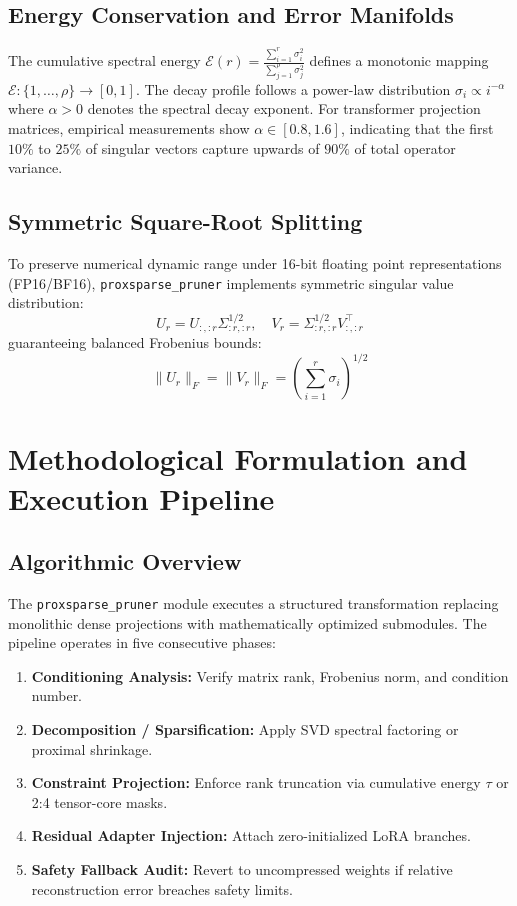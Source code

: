\subsection{Energy Conservation and Error Manifolds}
The cumulative spectral energy $\mathcal{E}(r) = \frac{\sum_{i=1}^r \sigma_i^2}{\sum_{j=1}^\rho \sigma_j^2}$ defines a monotonic mapping $\mathcal{E}: \{1, \dots, \rho\} \to [0, 1]$. The decay profile follows a power-law distribution $\sigma_i \propto i^{-\alpha}$ where $\alpha > 0$ denotes the spectral decay exponent. For transformer projection matrices, empirical measurements show $\alpha \in [0.8, 1.6]$, indicating that the first $10\%$ to $25\%$ of singular vectors capture upwards of $90\%$ of total operator variance.

\subsection{Symmetric Square-Root Splitting}
To preserve numerical dynamic range under 16-bit floating point representations (FP16/BF16), \texttt{proxsparse\_pruner} implements symmetric singular value distribution:
\[
U_r = U_{:, :r} \Sigma_{:r, :r}^{1/2}, \quad V_r = \Sigma_{:r, :r}^{1/2} V_{:, :r}^\top
\]
guaranteeing balanced Frobenius bounds:
\[
\|U_r\|_F = \|V_r\|_F = \left( \sum_{i=1}^{r} \sigma_i \right)^{1/2}
\]


\section{Methodological Formulation and Execution Pipeline}

\subsection{Algorithmic Overview}
The \texttt{proxsparse\_pruner} module executes a structured transformation replacing monolithic dense projections with mathematically optimized submodules. The pipeline operates in five consecutive phases:
\begin{enumerate}
\item \textbf{Conditioning Analysis:} Verify matrix rank, Frobenius norm, and condition number.
\item \textbf{Decomposition / Sparsification:} Apply SVD spectral factoring or proximal shrinkage.
\item \textbf{Constraint Projection:} Enforce rank truncation via cumulative energy $\tau$ or 2:4 tensor-core masks.
\item \textbf{Residual Adapter Injection:} Attach zero-initialized LoRA branches.
\item \textbf{Safety Fallback Audit:} Revert to uncompressed weights if relative reconstruction error breaches safety limits.
\end{enumerate}

